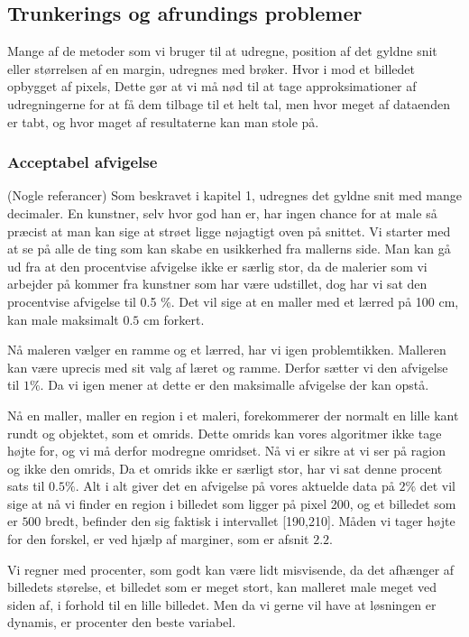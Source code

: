\subsection*{Trunkerings og afrundings problemer}
Mange af de metoder som vi bruger til at udregne, position af det gyldne
snit eller størrelsen af en margin, udregnes med brøker. Hvor i mod et
billedet opbygget af pixels, Dette gør at vi må nød til at tage
approksimationer af udregningerne for at få dem tilbage til et helt tal,
men hvor meget af dataenden er tabt, og hvor maget af resultaterne kan
man stole på.

\subsubsection{Acceptabel afvigelse}
(Nogle referancer)
Som beskravet i kapitel 1, udregnes det gyldne snit med mange decimaler.
En kunstner, selv hvor god han er, har ingen chance for at male så
præcist at man kan sige at strøet ligge nøjagtigt oven på snittet. Vi
starter med at se på alle de ting som kan skabe en usikkerhed fra
mallerns side. Man kan gå ud fra at den procentvise afvigelse ikke er
særlig stor, da de malerier som vi arbejder på kommer fra kunstner som
har være udstillet, dog har vi sat den procentvise afvigelse til 0.5 \%.
Det vil sige at en maller med et lærred på 100 cm, kan male maksimalt
$0.5$ cm forkert.

Nå maleren vælger en ramme og et lærred, har vi igen problemtikken.
Malleren kan være uprecis med sit valg af læret og ramme. Derfor sætter
vi den afvigelse til $1\%$. Da vi igen mener at dette er den maksimalle
afvigelse der kan opstå.

Nå en maller, maller en region i et maleri, forekommerer der normalt en
lille kant rundt og objektet, som et omrids. Dette omrids kan vores
algoritmer ikke tage højte for, og vi må derfor modregne omridset. Nå vi
er sikre at vi ser på ragion og ikke den omrids, Da et omrids ikke er
særligt stor, har vi sat denne procent sats til $0.5\%$. Alt i alt giver
det en afvigelse på vores aktuelde data på $2\%$ det vil sige at nå vi
finder en region i billedet som ligger på pixel 200, og et billedet som
er $500$ bredt, befinder den sig faktisk i intervallet [190,210]. Måden
vi tager højte for den forskel, er ved hjælp af marginer, som er afsnit
$2.2$.

Vi regner med procenter, som godt kan være lidt misvisende, da det
afhænger af billedets størelse, et billedet som er meget stort, kan
malleret male meget ved siden af, i forhold til en lille billedet. Men
da vi gerne vil have at løsningen er dynamis, er procenter den beste
variabel.

